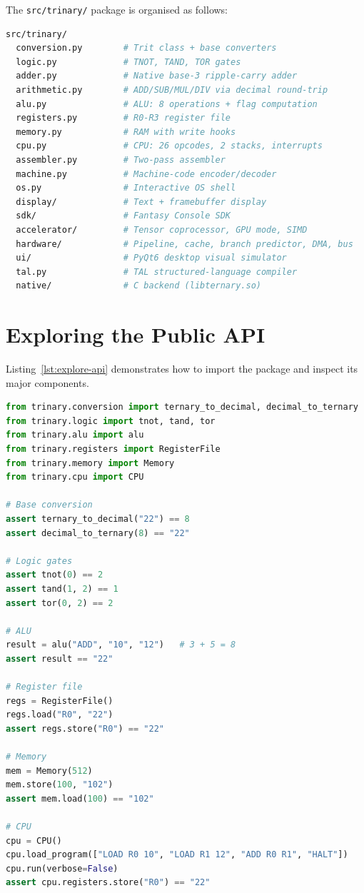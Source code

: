 The \texttt{src/trinary/} package is organised as follows:

\begin{lstlisting}[language=bash, caption={Package directory structure}, label={lst:dirs}]
src/trinary/
  conversion.py        # Trit class + base converters
  logic.py             # TNOT, TAND, TOR gates
  adder.py             # Native base-3 ripple-carry adder
  arithmetic.py        # ADD/SUB/MUL/DIV via decimal round-trip
  alu.py               # ALU: 8 operations + flag computation
  registers.py         # R0-R3 register file
  memory.py            # RAM with write hooks
  cpu.py               # CPU: 26 opcodes, 2 stacks, interrupts
  assembler.py         # Two-pass assembler
  machine.py           # Machine-code encoder/decoder
  os.py                # Interactive OS shell
  display/             # Text + framebuffer display
  sdk/                 # Fantasy Console SDK
  accelerator/         # Tensor coprocessor, GPU mode, SIMD
  hardware/            # Pipeline, cache, branch predictor, DMA, bus
  ui/                  # PyQt6 desktop visual simulator
  tal.py               # TAL structured-language compiler
  native/              # C backend (libternary.so)
\end{lstlisting}

\section{Exploring the Public API}

Listing~\ref{lst:explore-api} demonstrates how to import the package and inspect its major components.

\begin{lstlisting}[language=Python, caption={Exploring the Trinary public API}, label={lst:explore-api}]
from trinary.conversion import ternary_to_decimal, decimal_to_ternary
from trinary.logic import tnot, tand, tor
from trinary.alu import alu
from trinary.registers import RegisterFile
from trinary.memory import Memory
from trinary.cpu import CPU

# Base conversion
assert ternary_to_decimal("22") == 8
assert decimal_to_ternary(8) == "22"

# Logic gates
assert tnot(0) == 2
assert tand(1, 2) == 1
assert tor(0, 2) == 2

# ALU
result = alu("ADD", "10", "12")   # 3 + 5 = 8
assert result == "22"

# Register file
regs = RegisterFile()
regs.load("R0", "22")
assert regs.store("R0") == "22"

# Memory
mem = Memory(512)
mem.store(100, "102")
assert mem.load(100) == "102"

# CPU
cpu = CPU()
cpu.load_program(["LOAD R0 10", "LOAD R1 12", "ADD R0 R1", "HALT"])
cpu.run(verbose=False)
assert cpu.registers.store("R0") == "22"
\end{lstlisting}


